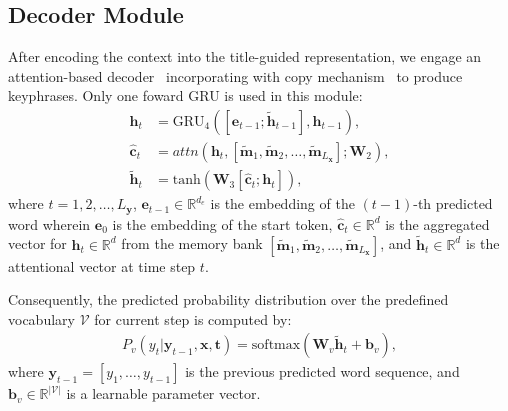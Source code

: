 \documentclass[letterpaper]{article} %
\begin{document}
\subsection{Decoder Module}
After encoding the context into the title-guided representation, we engage an attention-based decoder~\cite{luong2015attention} incorporating with copy mechanism~\cite{see2017get_to_the_point} to produce keyphrases. Only one foward GRU is used in this module: 
\begin{align}
\mathbf{h}_t &= \text{GRU}_4([\mathbf{e}_{t-1}; \tilde{\mathbf{h}}_{t-1}], \mathbf{h}_{t-1}), \\
\hat{\mathbf{c}}_t &= attn(\mathbf{h}_t, [\widetilde{\mathbf{m}}_1, \widetilde{\mathbf{m}}_2,\dots, \widetilde{\mathbf{m}}_{L_{\mathbf{x}}}]; \mathbf{W}_2), \\
\tilde{\mathbf{h}}_{t} &= \text{tanh}(\mathbf{W}_3[\hat{\mathbf{c}}_t; \mathbf{h}_t]),
\end{align}
where $t=1,2,\dots,L_{\mathbf{y}}$, $\mathbf{e}_{t-1} \in \mathbb{R}^{d_e}$ is the embedding of the $(t-1)$-th predicted word wherein $\mathbf{e}_0$ is the embedding of the start token, $\hat{\mathbf{c}}_t \in \mathbb{R}^d$ is the aggregated vector for $\mathbf{h}_t \in \mathbb{R}^d$ from the memory bank $[\widetilde{\mathbf{m}}_1, \widetilde{\mathbf{m}}_2,\dots, \widetilde{\mathbf{m}}_{L_{\mathbf{x}}}]$, and $\tilde{\mathbf{h}}_t \in \mathbb{R}^d$ is the attentional vector at time step $t$.

Consequently, the predicted probability distribution over the predefined vocabulary $\mathcal{V}$ for current step is computed by:
\begin{align}
P_{v}(y_{t}|\mathbf{y}_{t-1}, \mathbf{x}, \mathbf{t}) = \text{softmax}(\mathbf{W}_v\tilde{\mathbf{h}}_{t} + \mathbf{b}_v),
\end{align}
where $\mathbf{y}_{t-1} = [y_1,\dots, y_{t-1}]$ is the previous predicted word sequence, and $\mathbf{b}_v \in \mathbb{R}^{|\mathcal{V}|}$ is a learnable parameter vector.
\end{document}

